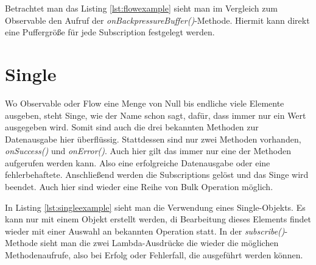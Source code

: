 Betrachtet man das Listing \ref{lst:flowexample} sieht man im Vergleich zum Observable den Aufruf der \textit{onBackpressureBuffer()}-Methode. Hiermit kann direkt eine Puffergröße für jede Subscription festgelegt werden. 

\section{Single}
Wo Observable oder Flow eine Menge von Null bis endliche viele Elemente ausgeben, steht Singe, wie der Name schon sagt, dafür, dass immer nur ein Wert ausgegeben wird. Somit sind auch die drei bekannten Methoden zur Datenausgabe hier überflüssig. Stattdessen sind nur zwei Methoden vorhanden, \textit{onSuccess()} und \textit{onError()}. Auch hier gilt das immer nur eine der Methoden aufgerufen werden kann. Also eine erfolgreiche Datenausgabe oder eine fehlerbehaftete. Anschließend werden die Subscriptions gelöst und das Singe wird beendet. Auch hier sind wieder eine Reihe von Bulk Operation möglich. 

In Listing \ref{lst:singleexample} sieht man die Verwendung eines Single-Objekts. Es kann nur mit einem Objekt erstellt werden, di Bearbeitung dieses Elements findet wieder mit einer Auswahl an bekannten Operation statt. In der \textit{subscribe()}-Methode sieht man die zwei Lambda-Ausdrücke die wieder die möglichen Methodenaufrufe, also bei Erfolg oder Fehlerfall, die ausgeführt werden können.
